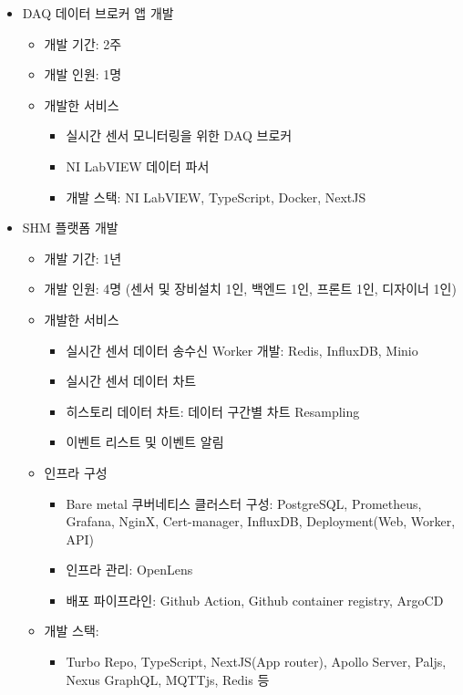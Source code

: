 
\begin{itemize}[label=]
	\item DAQ 데이터 브로커 앱 개발
	      \begin{itemize}[label=]
		      \item 개발 기간: 2주
		      \item 개발 인원: 1명
		      \item 개발한 서비스
		            \begin{itemize}
			            \item 실시간 센서 모니터링을 위한 DAQ 브로커
			            \item NI LabVIEW 데이터 파서
			            \item 개발 스택: NI LabVIEW, TypeScript, Docker, NextJS
		            \end{itemize}
	      \end{itemize}
	\item SHM 플랫폼 개발
	      \begin{itemize}[label=]
		      \item 개발 기간: 1년
		      \item 개발 인원: 4명 (센서 및 장비설치 1인, 백엔드 1인, 프론트 1인, 디자이너 1인)
		      \item 개발한 서비스
		            \begin{itemize}
			            \item 실시간 센서 데이터 송수신 Worker 개발: Redis, InfluxDB, Minio
			            \item 실시간 센서 데이터 차트
			            \item 히스토리 데이터 차트: 데이터 구간별 차트 Resampling
			            \item 이벤트 리스트 및 이벤트 알림
		            \end{itemize}
		      \item 인프라 구성
		            \begin{itemize}
			            \item Bare metal 쿠버네티스 클러스터 구성: PostgreSQL, Prometheus, Grafana, NginX, Cert-manager, InfluxDB, Deployment(Web, Worker, API)
			            \item 인프라 관리: OpenLens
			            \item 배포 파이프라인: Github Action, Github container registry, ArgoCD
		            \end{itemize}
		      \item 개발 스택:
		            \begin{itemize}
			            \item Turbo Repo, TypeScript, NextJS(App router), Apollo Server, Paljs, Nexus GraphQL, MQTTjs, Redis 등
		            \end{itemize}
	      \end{itemize}
\end{itemize}
